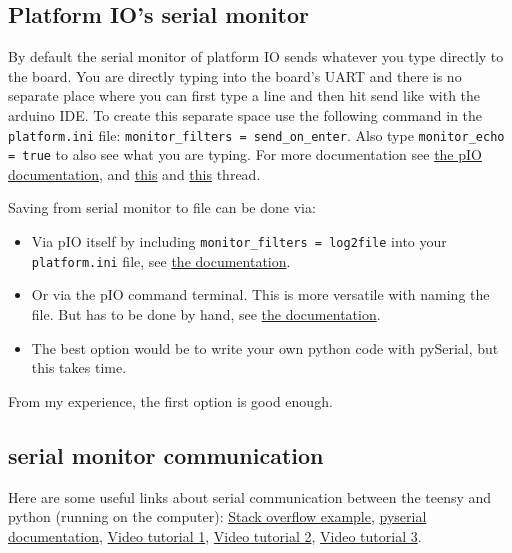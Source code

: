 \subsection{Platform IO's serial monitor}
By default the serial monitor of platform IO sends whatever you type directly to the board. 
You are directly typing into the board's UART and there is no separate place where you can first type a line and then hit send like with the arduino IDE.
To create this separate space use the following command in the \texttt{platform.ini} file: \texttt{monitor\_filters = send\_on\_enter}.
Also type \texttt{monitor\_echo = true} to also see what you are typing.
For more documentation see \href{https://docs.platformio.org/en/latest/core/userguide/device/cmd_monitor.html}{the pIO documentation}, and \href{> https://community.platformio.org/t/is-there-anyway-to-send-manually-typing-messages-to-arduino-through-serial-port-in-platformio/15326}{this} and \href{> https://community.platformio.org/t/write-to-serial-monitor/16321}{this} thread.

Saving from serial monitor to file can be done via:
\begin{itemize}
    \item Via pIO itself by including \texttt{monitor\_filters = log2file} into your \texttt{platform.ini} file, see \href{https://docs.platformio.org/en/latest/core/userguide/device/cmd_monitor.html#filters}{the documentation}.
    \item Or via the pIO command terminal. This is more versatile with naming the file. But has to be done by hand, see \href{https://community.platformio.org/t/managing-serial-port-output-and-saving-log-file/7771}{the documentation}.
    \item The best option would be to write your own python code with pySerial, but this takes time.
\end{itemize}
From my experience, the first option is good enough.

\subsection{serial monitor communication}
Here are some useful links about serial communication between the teensy and python (running on the computer):
\href{https://stackoverflow.com/questions/44056846/how-to-read-and-write-from-a-com-port-using-pyserial}{Stack overflow example},
\href{https://pyserial.readthedocs.io/en/latest/pyserial.html}{pyserial documentation},
\href{https://www.youtube.com/watch?v=AHr94RtMj1A}{Video tutorial 1},
\href{https://www.youtube.com/watch?v=fIlklRIuXoY}{Video tutorial 2},
\href{https://www.youtube.com/watch?v=iKGYbMD3NT8&list=PLb1SYTph-GZJb1CFM7ioVY9XJYlPVUBQy}{Video tutorial 3}.